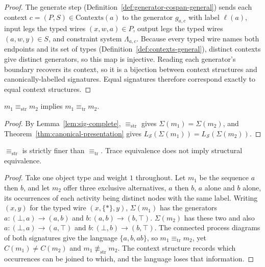 \begin{proof}
  The generate step (Definition~\ref{def:generator-cospan-general}) sends each context
  $c=(P,S)\in\mathrm{Contexts}(a)$ to the generator $g_{a,c}$ with label $\ell(a)$, input legs the
  typed wires $(x,w,a)\in P$, output legs the typed wires $(a,w,y)\in S$, and constraint system
  $\Lambda_{a,c}$. Because every typed wire names both endpoints and its set of types
  (Definition~\ref{def:contexts-general}), distinct contexts give distinct generators, so this map is injective. Reading each generator's boundary
  recovers its context, so it is a bijection between context structures and canonically-labelled
  signatures. Equal signatures therefore correspond exactly to equal context structures.
\end{proof}

\begin{lemma}[Soundness]\label{lem:equiv-soundness}
  $m_1 \equiv_{\mathrm{str}} m_2$ implies $m_1 \equiv_{\mathrm{tr}} m_2$.
\end{lemma}

\begin{proof}
  By Lemma~\ref{lem:sig-complete}, $\equiv_{\mathrm{str}}$ gives $\Sigma(m_1)=\Sigma(m_2)$, and Theorem~\ref{thm:canonical-presentation} gives
  $L_{\mathcal{S}}(\Sigma(m_1))=L_{\mathcal{S}}(\Sigma(m_2))$.
\end{proof}

\begin{lemma}[Strictness]\label{lem:equiv-strictness}
  $\equiv_{\mathrm{str}}$ is strictly finer than $\equiv_{\mathrm{tr}}$. Trace equivalence does not
  imply structural equivalence.
\end{lemma}

\begin{proof}
  Take one object type and weight $1$ throughout. Let $m_1$ be the sequence $a$ then $b$, and let
  $m_2$ offer three exclusive alternatives, $a$ then $b$, $a$ alone and $b$ alone, its occurrences
  of each activity being distinct nodes with the same label. Writing $(x,y)$ for the typed wire
  $(x,\{\ast\},y)$, $\Sigma(m_1)$ has the generators $a:(\bot,a)\to(a,b)$ and $b:(a,b)\to(b,\top)$.
  $\Sigma(m_2)$ has these two and also $a:(\bot,a)\to(a,\top)$ and $b:(\bot,b)\to(b,\top)$. The
  connected process diagrams of both signatures give the language $\{a,b,ab\}$, so
  $m_1\equiv_{\mathrm{tr}}m_2$, yet $C(m_1)\ne C(m_2)$ and $m_1\not\equiv_{\mathrm{str}}m_2$. The
  context structure records which occurrences can be joined to which, and the language loses
  that information.
\end{proof}


